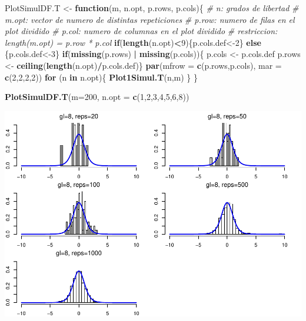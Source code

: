 \documentclass[]{article}
\newenvironment{Shaded}{\begin{snugshade}}{\end{snugshade}}
\newcommand{\CommentTok}[1]{\textcolor[rgb]{0.56,0.35,0.01}{\textit{#1}}}
\newcommand{\ControlFlowTok}[1]{\textcolor[rgb]{0.13,0.29,0.53}{\textbf{#1}}}
\newcommand{\DataTypeTok}[1]{\textcolor[rgb]{0.13,0.29,0.53}{#1}}
\newcommand{\DecValTok}[1]{\textcolor[rgb]{0.00,0.00,0.81}{#1}}
\newcommand{\KeywordTok}[1]{\textcolor[rgb]{0.13,0.29,0.53}{\textbf{#1}}}
\newcommand{\NormalTok}[1]{#1}
\newcommand{\OperatorTok}[1]{\textcolor[rgb]{0.81,0.36,0.00}{\textbf{#1}}}
\newcommand{\StringTok}[1]{\textcolor[rgb]{0.31,0.60,0.02}{#1}}
\begin{document}
\begin{Shaded}
\begin{Highlighting}[]
\NormalTok{PlotSimulDF.T <-}\StringTok{ }\ControlFlowTok{function}\NormalTok{(m, n.opt, p.rows, p.cols)\{}
  \CommentTok{# n: grados de libertad }
  \CommentTok{# m.opt: vector de numero de distintas repeticiones}
  \CommentTok{# p.row: numero de filas en el plot dividido}
  \CommentTok{# p.col: numero de columnas en el plot dividido}
  \CommentTok{# restriccion: length(m.opt) = p.row * p.col}
  \ControlFlowTok{if}\NormalTok{(}\KeywordTok{length}\NormalTok{(n.opt)}\OperatorTok{<}\DecValTok{9}\NormalTok{)\{p.cols.def<-}\DecValTok{2}\NormalTok{\} }\ControlFlowTok{else}\NormalTok{ \{p.cols.def<-}\DecValTok{3}\NormalTok{\}}
  \ControlFlowTok{if}\NormalTok{(}\KeywordTok{missing}\NormalTok{(p.rows) }\OperatorTok{|}\StringTok{ }\KeywordTok{missing}\NormalTok{(p.cols))\{}
\NormalTok{    p.cols <-}\StringTok{ }\NormalTok{p.cols.def}
\NormalTok{    p.rows <-}\StringTok{ }\KeywordTok{ceiling}\NormalTok{(}\KeywordTok{length}\NormalTok{(n.opt)}\OperatorTok{/}\NormalTok{p.cols.def)\}}
  \KeywordTok{par}\NormalTok{(}\DataTypeTok{mfrow =} \KeywordTok{c}\NormalTok{(p.rows,p.cols), }\DataTypeTok{mar =} \KeywordTok{c}\NormalTok{(}\DecValTok{2}\NormalTok{,}\DecValTok{2}\NormalTok{,}\DecValTok{2}\NormalTok{,}\DecValTok{2}\NormalTok{))}
  \ControlFlowTok{for}\NormalTok{ (n }\ControlFlowTok{in}\NormalTok{ n.opt)\{}
    \KeywordTok{Plot1Simul.T}\NormalTok{(n,m)}
\NormalTok{  \}}
\NormalTok{\}}

\KeywordTok{PlotSimulDF.T}\NormalTok{(}\DataTypeTok{m=}\DecValTok{200}\NormalTok{, }\DataTypeTok{n.opt =} \KeywordTok{c}\NormalTok{(}\DecValTok{1}\NormalTok{,}\DecValTok{2}\NormalTok{,}\DecValTok{3}\NormalTok{,}\DecValTok{4}\NormalTok{,}\DecValTok{5}\NormalTok{,}\DecValTok{6}\NormalTok{,}\DecValTok{8}\NormalTok{))}
\end{Highlighting}
\end{Shaded}

\includegraphics{NotaDeClaseLong_files/figure-latex/unnamed-chunk-15-3.pdf}
\end{document}
